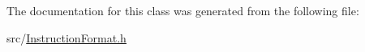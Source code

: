 The documentation for this class was generated from the following file\+:\begin{DoxyCompactItemize}
\item 
src/\hyperlink{InstructionFormat_8h}{Instruction\+Format.\+h}\end{DoxyCompactItemize}
